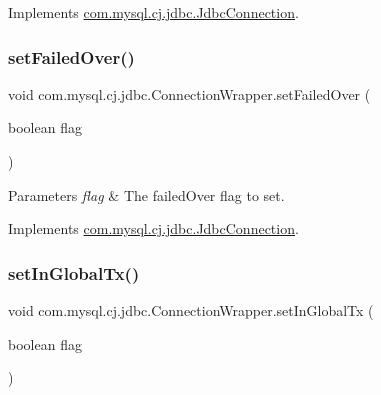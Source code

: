 Implements \mbox{\hyperlink{interfacecom_1_1mysql_1_1cj_1_1jdbc_1_1_jdbc_connection_aa15ffc32d47d1950257c4720802694bf}{com.\+mysql.\+cj.\+jdbc.\+Jdbc\+Connection}}.

\mbox{\label{classcom_1_1mysql_1_1cj_1_1jdbc_1_1_connection_wrapper_aaa41827ca4520529797d55c4f8834f76}} 
\subsubsection{\texorpdfstring{set\+Failed\+Over()}{setFailedOver()}}
{\footnotesize\ttfamily void com.\+mysql.\+cj.\+jdbc.\+Connection\+Wrapper.\+set\+Failed\+Over (\begin{DoxyParamCaption}\item[{boolean}]{flag }\end{DoxyParamCaption})}


\begin{DoxyParams}{Parameters}
{\em flag} & The failed\+Over flag to set. \\
\hline
\end{DoxyParams}


Implements \mbox{\hyperlink{interfacecom_1_1mysql_1_1cj_1_1jdbc_1_1_jdbc_connection_a65cb0cc5d2afc54002bfc16222bbe402}{com.\+mysql.\+cj.\+jdbc.\+Jdbc\+Connection}}.

\mbox{\label{classcom_1_1mysql_1_1cj_1_1jdbc_1_1_connection_wrapper_adb320c4558060ee9dae32dc4d4310beb}} 
\subsubsection{\texorpdfstring{set\+In\+Global\+Tx()}{setInGlobalTx()}}
{\footnotesize\ttfamily void com.\+mysql.\+cj.\+jdbc.\+Connection\+Wrapper.\+set\+In\+Global\+Tx (\begin{DoxyParamCaption}\item[{boolean}]{flag }\end{DoxyParamCaption})}

